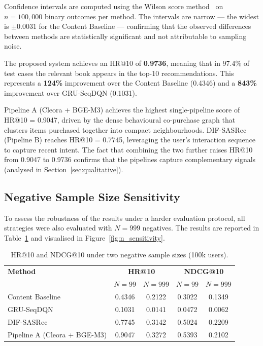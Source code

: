 Confidence intervals are computed using the Wilson score method~\cite{wilson1927} on $n = 100{,}000$ binary outcomes per method.
The intervals are narrow — the widest is $\pm 0.0031$ for the Content Baseline — confirming that the observed differences between methods are statistically significant and not attributable to sampling noise.

The proposed system achieves an HR@10 of \textbf{0.9736}, meaning that in 97.4\% of test cases the relevant book appears in the top-10 recommendations.
This represents a \textbf{124\%} improvement over the Content Baseline (0.4346) and a \textbf{843\%} improvement over GRU-SeqDQN (0.1031).

Pipeline A (Cleora + BGE-M3) achieves the highest single-pipeline score of HR@10 = 0.9047, driven by the dense behavioural co-purchase graph that clusters items purchased together into compact neighbourhoods.
DIF-SASRec (Pipeline B) reaches HR@10 = 0.7745, leveraging the user's interaction sequence to capture recent intent.
The fact that combining the two further raises HR@10 from 0.9047 to 0.9736 confirms that the pipelines capture complementary signals (analysed in Section~\ref{sec:qualitative}).

\subsection{Negative Sample Size Sensitivity}
\label{sec:n_sensitivity}

To assess the robustness of the results under a harder evaluation protocol, all strategies were also evaluated with $N = 999$ negatives.
The results are reported in Table~\ref{tab:n_sensitivity} and visualised in Figure~\ref{fig:n_sensitivity}.

\begin{table}[H]
\centering
\caption{HR@10 and NDCG@10 under two negative sample sizes (100k users).}
\label{tab:n_sensitivity}
\begin{tabular}{lcccc}
\hline
\textbf{Method} & \multicolumn{2}{c}{\textbf{HR@10}} & \multicolumn{2}{c}{\textbf{NDCG@10}} \\
                & $N = 99$ & $N = 999$ & $N = 99$ & $N = 999$ \\
\hline
Content Baseline             & 0.4346 & 0.2122 & 0.3022 & 0.1349 \\
GRU-SeqDQN                   & 0.1031 & 0.0141 & 0.0472 & 0.0062 \\
DIF-SASRec                   & 0.7745 & 0.3142 & 0.5024 & 0.2209 \\
Pipeline A (Cleora + BGE-M3) & 0.9047 & 0.3272 & 0.5393 & 0.2102 \\
\hline
\end{tabular}
\end{table}


